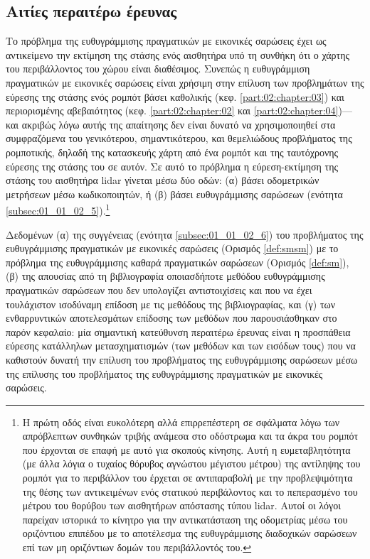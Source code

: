 \subsection{Αιτίες περαιτέρω έρευνας}
\label{subsection:02_04_07:02}

Το πρόβλημα της ευθυγράμμισης πραγματικών με εικονικές σαρώσεις έχει ως
αντικείμενο την εκτίμηση της στάσης ενός αισθητήρα υπό τη συνθήκη ότι ο χάρτης
του περιβάλλοντος του χώρου είναι διαθέσιμος. Συνεπώς η ευθυγράμμιση
πραγματικών με εικονικές σαρώσεις είναι χρήσιμη στην επίλυση των προβλημάτων
της εύρεσης της στάσης ενός ρομπότ βάσει καθολικής (κεφ.
\ref{part:02:chapter:03}) και περιορισμένης αβεβαιότητος (κεφ.
\ref{part:02:chapter:02} και \ref{part:02:chapter:04})---και ακριβώς λόγω αυτής
της απαίτησης δεν είναι δυνατό να χρησιμοποιηθεί στα συμφραζόμενα του
γενικότερου, σημαντικότερου, και θεμελιώδους προβλήματος της ρομποτικής, δηλαδή
της κατασκευής χάρτη από ένα ρομπότ και της ταυτόχρονης εύρεσης της στάσης του
σε αυτόν. Σε αυτό το πρόβλημα η εύρεση-εκτίμηση της στάσης του αισθητήρα lidar
γίνεται μέσω δύο οδών: (α) βάσει οδομετρικών μετρήσεων μέσω κωδικοποιητών, ή
(β) βάσει ευθυγράμμισης σαρώσεων (ενότητα \ref{subsec:01_01_02_5}).\footnote{Η
πρώτη οδός είναι ευκολότερη αλλά επιρρεπέστερη σε σφάλματα λόγω των απρόβλεπτων
συνθηκών τριβής ανάμεσα στο οδόστρωμα και τα άκρα του ρομπότ που έρχονται σε
επαφή με αυτό για σκοπούς κίνησης. Αυτή η ευμεταβλητότητα (με άλλα λόγια ο
τυχαίος θόρυβος αγνώστου μέγιστου μέτρου) της αντίληψης του ρομπότ για το
περιβάλλον του έρχεται σε αντιπαραβολή με την προβλεψιμότητα της θέσης των
αντικειμένων ενός στατικού περιβάλοντος και το πεπερασμένο του μέτρου του
θορύβου των αισθητήρων απόστασης τύπου lidar. Αυτοί οι λόγοι παρείχαν ιστορικά
το κίνητρο για την αντικατάσταση της οδομετρίας μέσω του οριζόντιου επιπέδου με
το αποτέλεσμα της ευθυγράμμισης διαδοχικών σαρώσεων επί των μη οριζόντιων δομών
του περιβάλλοντός του.}

Δεδομένων (α) της συγγένειας (ενότητα \ref{subsec:01_01_02_6}) του προβλήματος
της ευθυγράμμισης πραγματικών με εικονικές σαρώσεις (Ορισμός \ref{def:smsm}) με
το πρόβλημα της ευθυγράμμισης καθαρά πραγματικών σαρώσεων (Ορισμός
\ref{def:sm}), (β) της απουσίας από τη βιβλιογραφία οποιασδήποτε μεθόδου
ευθυγράμμισης πραγματικών σαρώσεων που δεν υπολογίζει αντιστοιχίσεις και που να
έχει τουλάχιστον ισοδύναμη επίδοση με τις μεθόδους της βιβλιογραφίας, και (γ)
των ενθαρρυντικών αποτελεσμάτων επίδοσης των μεθόδων που παρουσιάσθηκαν στο
παρόν κεφαλαίο: μία σημαντική κατεύθυνση περαιτέρω έρευνας είναι η προσπάθεια
εύρεσης κατάλληλων μετασχηματισμών (των μεθόδων και των εισόδων τους) που να
καθιστούν δυνατή την επίλυση του προβλήματος της ευθυγράμμισης σαρώσεων μέσω
της επίλυσης του προβλήματος της ευθυγράμμισης πραγματικών με εικονικές
σαρώσεις.
